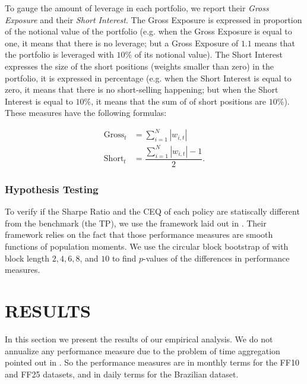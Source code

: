 \documentclass[12pt,oneside,a4paper]{memoir}
\begin{document}
To gauge the amount of leverage in each portfolio, we report their \textit{Gross Exposure} and their \textit{Short Interest}.
The Gross Exposure is expressed in proportion of the notional value of the portfolio (e.g. when the Gross Exposure is equal to one, it means that there is no leverage; but a Gross Exposure of $1.1$ means that the portfolio is leveraged with $10\%$ of its notional value).
The Short Interest expresses the size of the short positions (weights smaller than zero) in the portfolio, it is expressed in percentage (e.g. when the Short Interest is equal to zero, it means that there is no short-selling happening; but when the Short Interest is equal to $10\%$, it means that the sum of of short positions are $10\%$).
These measures have the following formulas:

\vspace{-18 pt}
\begin{align*}
\label{gross}
\text{Gross}_{t} &= \sum_{i=1}^{N} |w_{i,t}|
\\
\label{short}
\text{Short}_{t} &= \dfrac{\sum_{i=1}^{N} |w_{i,t}| - 1}{2}.
\end{align*}

\subsubsection*{Hypothesis Testing}

To verify if the Sharpe Ratio and the CEQ of each policy are statiscally different from the benchmark (the TP), we use the framework laid out in .
Their framework relies on the fact that those performance measures are smooth functions of population moments.
We use the circular block bootstrap of  with block length $2, 4, 6, 8$, and $10$ to find $p$-values of the differences in performance measures.

\section{RESULTS} \label{sec:results:tp}

In this section we present the results of our empirical analysis.
We do not annualize any performance measure due to the problem of time aggregation pointed out in .
So the performance measures are in monthly terms for the FF10 and FF25 datasets, and in daily terms for the Brazilian dataset.
\end{document}
